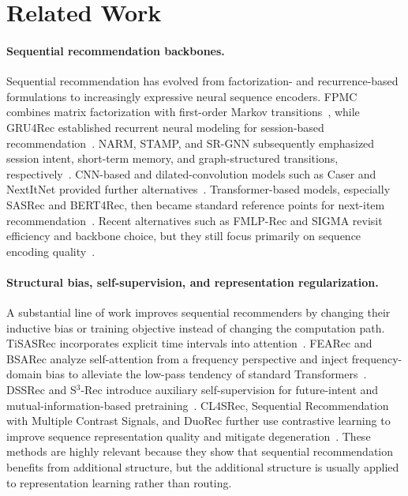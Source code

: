 \documentclass[sigconf,anonymous,review]{acmart}
\begin{document}
\section{Related Work}
\label{sec:related}

\paragraph{Sequential recommendation backbones.}
Sequential recommendation has evolved from factorization- and recurrence-based formulations to increasingly expressive neural sequence encoders. FPMC combines matrix factorization with first-order Markov transitions~\cite{rendle2010fpmc}, while GRU4Rec established recurrent neural modeling for session-based recommendation~\cite{hidasi2016gru4rec}. NARM, STAMP, and SR-GNN subsequently emphasized session intent, short-term memory, and graph-structured transitions, respectively~\cite{li2017narm,liu2018stamp,wu2019srgnn}. CNN-based and dilated-convolution models such as Caser and NextItNet provided further alternatives~\cite{tang2018caser,yuan2019nextitnet}. Transformer-based models, especially SASRec and BERT4Rec, then became standard reference points for next-item recommendation~\cite{kang2018sasrec,sun2019bert4rec}. Recent alternatives such as FMLP-Rec and SIGMA revisit efficiency and backbone choice, but they still focus primarily on sequence encoding quality~\cite{zhou2022fmlprec,liu2025sigma}.

\paragraph{Structural bias, self-supervision, and representation regularization.}
A substantial line of work improves sequential recommenders by changing their inductive bias or training objective instead of changing the computation path. TiSASRec incorporates explicit time intervals into attention~\cite{li2020tisasrec}. FEARec and BSARec analyze self-attention from a frequency perspective and inject frequency-domain bias to alleviate the low-pass tendency of standard Transformers~\cite{du2023fearec,shin2024bsarec}. DSSRec and S$^3$-Rec introduce auxiliary self-supervision for future-intent and mutual-information-based pretraining~\cite{ma2020dssrec,zhou2020s3rec}. CL4SRec, Sequential Recommendation with Multiple Contrast Signals, and DuoRec further use contrastive learning to improve sequence representation quality and mitigate degeneration~\cite{xie2020cl4srec,wang2023multiplecontrast,qiu2022duorec}. These methods are highly relevant because they show that sequential recommendation benefits from additional structure, but the additional structure is usually applied to representation learning rather than routing.
\end{document}
